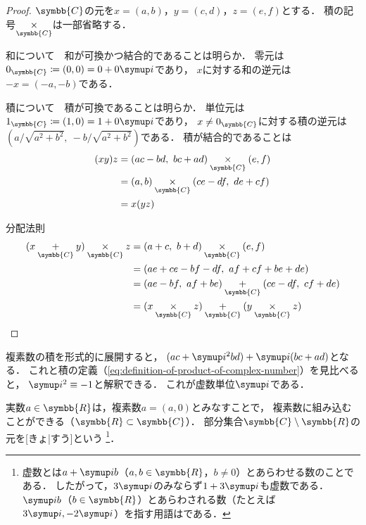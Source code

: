 \documentclass[../sotsu.tex]{subfiles}
\begin{document}
\begin{proof}
    $\symbb{C}$の元を$x = (a, b)$，$y = (c, d)$，$z = (e, f)$とする．
    積の記号$\underset{\symbb{C}}{\times}$は一部省略する．

    \textsf{和について}　和が可換かつ結合的であることは明らか．
    零元は$0_{\symbb{C}} \coloneq (0, 0) = 0 + 0\iu$であり，
    $x$に対する和の逆元は$-x = (-a, -b)$である．

    \textsf{積について}　積が可換であることは明らか．
    単位元は$1_{\symbb{C}} \coloneq (1, 0) = 1 + 0\iu$であり，
    $x \neq 0_{\symbb{C}}$に対する積の逆元は$(a / \sqrt{a^2 + b^2}, \  -b / \sqrt{a^2 + b^2} )$である．
    積が結合的であることは
    \begin{equation*}
        \begin{split}
            (xy)z &= (ac-bd, \  bc+ad) \underset{\symbb{C}}{\times} (e, f)   \\
                  &= (a, b) \underset{\symbb{C}}{\times} (ce-df, \  de+cf)   \\
                  &= x(yz)
        \end{split}
    \end{equation*}

    \textsf{分配法則}　
    \begin{equation*}
        \begin{split}
            (x \underset{\symbb{C}}{+} y) \underset{\symbb{C}}{\times} z
            &= (a+c, \  b+d) \underset{\symbb{C}}{\times} (e, f)   \\ 
            &= (ae+ce-bf-df, \  af+cf+be+de)   \\
            &= (ae-bf, \  af+be) \underset{\symbb{C}}{+} (ce-df, \  cf+de)   \\
            &= (x \underset{\symbb{C}}{\times} z) \underset{\symbb{C}}{+}
               (y \underset{\symbb{C}}{\times} z)
        \end{split}
    \end{equation*}
\end{proof}

複素数の積を形式的に展開すると，
$(ac + \iu^2 bd) + \iu (bc + ad)$となる．
これと積の定義（\cref{eq:definition-of-product-of-complex-number}）を見比べると，
$\iu^2 \equiv -1$と解釈できる．
これが虚数単位$\iu$である．

実数$a \in \symbb{R}$は，複素数$a = (a, 0)$とみなすことで，
複素数に組み込むことができる（$\symbb{R} \subset \symbb{C}$）．
部分集合$\symbb{C} \setminus \symbb{R}$の元を[きょ|すう]という%
\footnote{
    虚数とは$a + \iu b$（$a, b \in \symbb{R}$，$b \neq 0$）とあらわせる数のことである．
    したがって，$3\iu$のみならず$1 + 3\iu$も虚数である．
    $\iu b$（$b \in \symbb{R}$）とあらわされる数（たとえば$3\iu, -2\iu$）を指す用語はである．
}．
\end{document}
